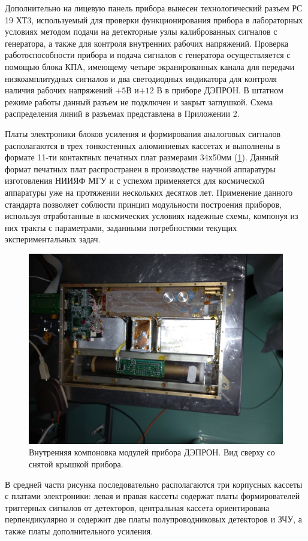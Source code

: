 Дополнительно на лицевую панель прибора вынесен технологический разъем РС 19 ХТ3, используемый для проверки функционирования прибора в лабораторных условиях методом подачи на детекторные узлы калиброванных сигналов с генератора, а также для контроля внутренних рабочих напряжений. Проверка работоспособности прибора и подача сигналов с генератора осуществляется с помощью  блока КПА, имеющему четыре экранированных канала для передачи низкоамплитудных сигналов и два светодиодных индикатора для контроля наличия рабочих напряжений  $ +5  $В и$  +12 $ В в приборе ДЭПРОН.  В штатном режиме работы данный разъем не подключен и закрыт заглушкой. Схема распределения линий в разъемах представлена в Приложении 2.

Платы электроники блоков усиления и формирования аналоговых сигналов располагаются в трех тонкостенных алюминиевых кассетах и выполнены в формате 11-ти контактных печатных плат размерами 34х50мм (\ref{fig:Depron_inside}). Данный формат печатных плат распространен в производстве научной аппаратуры изготовления НИИЯФ МГУ и с успехом применяется для космической аппаратуры уже на протяжении нескольких десятков лет. Применение данного стандарта позволяет соблюсти принцип модульности построения приборов, используя отработанные в космических условиях надежные схемы, компонуя из них тракты с параметрами, заданными потребностями текущих экспериментальных задач. 

\begin{figure}
\centering
\includegraphics[width=0.7\linewidth]{images/Depron_inside}
\caption{Внутренняя компоновка модулей прибора ДЭПРОН. Вид сверху со снятой крышкой прибора.}
\label{fig:Depron_inside}
\end{figure}


В средней части рисунка последовательно располагаются три корпусных кассеты с платами электроники: левая и правая кассеты содержат платы формирователей триггерных сигналов от детекторов, центральная кассета ориентирована перпендикулярно и содержит две платы полупроводниковых детекторов и ЗЧУ, а также платы дополнительного усиления.

